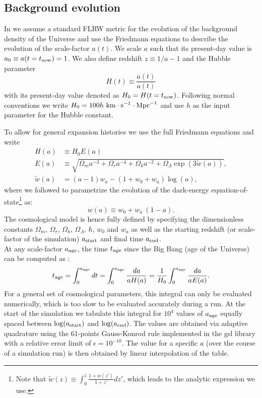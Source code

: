 \subsection{Background evolution}
\label{ssec:flrw}

In \swift we assume a standard FLRW metric for the evolution of the background
density of the Universe and use the Friedmann equations to describe the
evolution of the scale-factor $a(t)$.  We scale $a$ such that its present-day
value is $a_0 \equiv a(t=t_{\rm now}) = 1$. We also define redshift $z \equiv
1/a - 1$ and the Hubble parameter
\begin{equation}
H(t) \equiv \frac{\dot{a}(t)}{a(t)}
\end{equation}
with its present-day value denoted as $H_0 = H(t=t_{\rm now})$. Following
normal conventions we write $H_0 = 100
h~\rm{km}\cdot\rm{s}^{-1}\cdot\rm{Mpc}^{-1}$ and use $h$ as the input parameter
for the Hubble constant.

To allow for general expansion histories we use the full Friedmann equations
and write
\begin{align}
H(a) &\equiv H_0 E(a) \\ E(a) &\equiv\sqrt{\Omega_m a^{-3} + \Omega_r
  a^{-4} + \Omega_k a^{-2} + \Omega_\Lambda \exp\left(3\tilde{w}(a)\right)},
\\
\tilde{w}(a) &= (a-1)w_a - (1+w_0 + w_a)\log\left(a\right),
\label{eq:friedmann}
\end{align}
where we followed \cite{Linder2003} to parametrize the evolution of
the dark-energy equation-of-state\footnote{Note that $\tilde{w}(z)\equiv
  \int_0^z \frac{1+w(z')}{1+z'}dz'$, which leads to the analytic
  expression we use.} as:
\begin{equation}
w(a) \equiv w_0 + w_a~(1-a).
\end{equation}
The cosmological model is hence fully defined by specifying the dimensionless
constants $\Omega_m$, $\Omega_r$, $\Omega_k$, $\Omega_\Lambda$, $h$, $w_0$ and
$w_a$ as well as the starting redshift (or scale-factor of the simulation)
$a_{\rm start}$ and final time $a_{\rm end}$. \\ At any scale-factor $a_{\rm
age}$, the time $t_{\rm age}$ since the Big Bang (age of the Universe) can be
computed as \citep[e.g.][]{Wright2006}:
\begin{equation}
  t_{\rm age} = \int_{0}^{a_{\rm age}} dt = \int_{0}^{a_{\rm age}}
  \frac{da}{a H(a)} = \frac{1}{H_0} \int_{0}^{a_{\rm age}}
  \frac{da}{a E(a)}.
\end{equation}
For a general set of cosmological parameters, this integral can only be
evaluated numerically, which is too slow to be evaluated accurately during a
run. At the start of the simulation we tabulate this integral for $10^4$ values
of $a_{\rm age}$ equally spaced between $\log(a_{\rm start})$ and $\log(a_{\rm
end})$. The values are obtained via adaptive quadrature using the 61-points
Gauss-Konrod rule implemented in the {\sc gsl} library \citep{GSL} with a
relative error limit of $\epsilon=10^{-10}$. The value for a specific $a$ (over
the course of a simulation run) is then obtained by linear interpolation of the
table.

